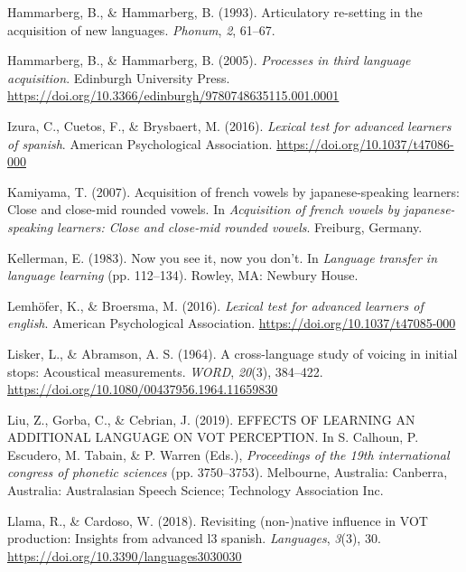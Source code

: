 \documentclass[
  english,
  man]{apa6}
\begin{document}
\leavevmode\hypertarget{ref-hammarberg_articulatory_1993}{}%
Hammarberg, B., \& Hammarberg, B. (1993). Articulatory re-setting in the acquisition of new languages. \emph{Phonum}, \emph{2}, 61--67.

\leavevmode\hypertarget{ref-hammarberg_processes_2005}{}%
Hammarberg, B., \& Hammarberg, B. (2005). \emph{Processes in third language acquisition}. Edinburgh University Press. \url{https://doi.org/10.3366/edinburgh/9780748635115.001.0001}

\leavevmode\hypertarget{ref-izura_lexical_2016}{}%
Izura, C., Cuetos, F., \& Brysbaert, M. (2016). \emph{Lexical test for advanced learners of spanish}. American Psychological Association. \url{https://doi.org/10.1037/t47086-000}

\leavevmode\hypertarget{ref-kamiyama_acquisition_2007}{}%
Kamiyama, T. (2007). Acquisition of french vowels by japanese-speaking learners: Close and close-mid rounded vowels. In \emph{Acquisition of french vowels by japanese-speaking learners: Close and close-mid rounded vowels}. Freiburg, Germany.

\leavevmode\hypertarget{ref-kellerman_now_1983}{}%
Kellerman, E. (1983). Now you see it, now you don't. In \emph{Language transfer in language learning} (pp. 112--134). Rowley, MA: Newbury House.

\leavevmode\hypertarget{ref-lemhofer_lexical_2016}{}%
Lemhöfer, K., \& Broersma, M. (2016). \emph{Lexical test for advanced learners of english}. American Psychological Association. \url{https://doi.org/10.1037/t47085-000}

\leavevmode\hypertarget{ref-lisker_cross-language_1964}{}%
Lisker, L., \& Abramson, A. S. (1964). A cross-language study of voicing in initial stops: Acoustical measurements. \emph{\textup{WORD}}, \emph{20}(3), 384--422. \url{https://doi.org/10.1080/00437956.1964.11659830}

\leavevmode\hypertarget{ref-liu_effects_2019}{}%
Liu, Z., Gorba, C., \& Cebrian, J. (2019). EFFECTS OF LEARNING AN ADDITIONAL LANGUAGE ON VOT PERCEPTION. In S. Calhoun, P. Escudero, M. Tabain, \& P. Warren (Eds.), \emph{Proceedings of the 19th international congress of phonetic sciences} (pp. 3750--3753). Melbourne, Australia: Canberra, Australia: Australasian Speech Science; Technology Association Inc.

\leavevmode\hypertarget{ref-llama_revisiting_2018}{}%
Llama, R., \& Cardoso, W. (2018). Revisiting (non-)native influence in VOT production: Insights from advanced l3 spanish. \emph{Languages}, \emph{3}(3), 30. \url{https://doi.org/10.3390/languages3030030}
\end{document}

